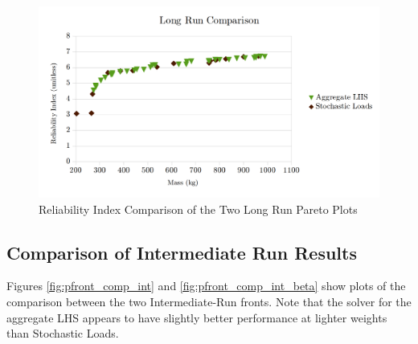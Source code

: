 \begin{figure}[!htbp]
\includegraphics[width=\textwidth]{img/pf_comp_long_beta.png}
\caption{Reliability Index Comparison of the Two Long Run Pareto Plots}
\label{fig:pfront_comp_long_beta}
\end{figure}

\subsection{Comparison of Intermediate Run Results}
Figures \ref{fig:pfront_comp_int} and \ref{fig:pfront_comp_int_beta} show plots of the comparison between the two Intermediate-Run fronts. Note that the solver for the aggregate LHS appears to have slightly better performance at lighter weights than Stochastic Loads. 

